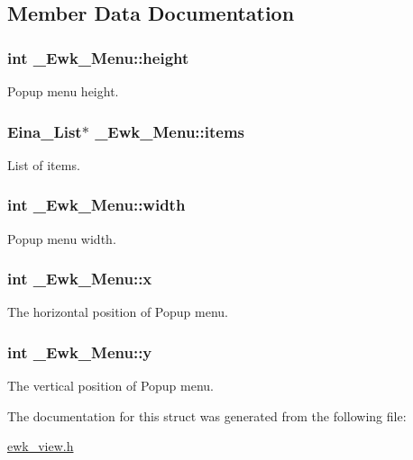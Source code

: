 \subsection{Member Data Documentation}
\hypertarget{struct__Ewk__Menu_ab820d3fd361f18580adf97aa6273ac70}{
\subsubsection[{height}]{\setlength{\rightskip}{0pt plus 5cm}int \+\_\+\+Ewk\+\_\+\+Menu\+::height}}\label{struct__Ewk__Menu_ab820d3fd361f18580adf97aa6273ac70}
Popup menu height. \hypertarget{struct__Ewk__Menu_af8209eb62a25b2a9de02794deed521fb}{
\subsubsection[{items}]{\setlength{\rightskip}{0pt plus 5cm}Eina\+\_\+\+List$\ast$ \+\_\+\+Ewk\+\_\+\+Menu\+::items}}\label{struct__Ewk__Menu_af8209eb62a25b2a9de02794deed521fb}
List of items. \hypertarget{struct__Ewk__Menu_ab728557f34eabfceaca659953b852523}{
\subsubsection[{width}]{\setlength{\rightskip}{0pt plus 5cm}int \+\_\+\+Ewk\+\_\+\+Menu\+::width}}\label{struct__Ewk__Menu_ab728557f34eabfceaca659953b852523}
Popup menu width. \hypertarget{struct__Ewk__Menu_aaef787698c24971081207c50f2377ca1}{
\subsubsection[{x}]{\setlength{\rightskip}{0pt plus 5cm}int \+\_\+\+Ewk\+\_\+\+Menu\+::x}}\label{struct__Ewk__Menu_aaef787698c24971081207c50f2377ca1}
The horizontal position of Popup menu. \hypertarget{struct__Ewk__Menu_ab6a7efedc1706adc095607da63a416c6}{
\subsubsection[{y}]{\setlength{\rightskip}{0pt plus 5cm}int \+\_\+\+Ewk\+\_\+\+Menu\+::y}}\label{struct__Ewk__Menu_ab6a7efedc1706adc095607da63a416c6}
The vertical position of Popup menu. 

The documentation for this struct was generated from the following file\+:\begin{DoxyCompactItemize}
\item 
\hyperlink{ewk__view_8h}{ewk\+\_\+view.\+h}\end{DoxyCompactItemize}
